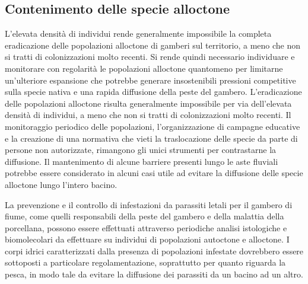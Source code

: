 \documentclass[10pt,twoside,openany,x11names,svgnames,italian,a5paper,dvipsnames,table]{memoir}
\begin{document}
\subsection{Contenimento delle specie alloctone}
L'elevata densità di individui rende generalmente impossibile la completa eradicazione delle popolazioni alloctone di gamberi sul territorio, a meno che non si tratti di colonizzazioni molto recenti. Si rende quindi necessario individuare e monitorare con regolarità le popolazioni alloctone quantomeno per limitarne un'ulteriore espansione che potrebbe generare insostenibili pressioni competitive sulla specie nativa e una rapida diffusione della peste del gambero.  L’eradicazione delle popolazioni alloctone risulta generalmente impossibile per via dell’elevata densità di individui, a meno che non si tratti di colonizzazioni molto recenti. Il monitoraggio periodico delle popolazioni, l’organizzazione di campagne educative e la creazione di una normativa che vieti la traslocazione delle specie da parte di persone non autorizzate, rimangono gli unici strumenti per contrastarne la diffusione. Il mantenimento di alcune barriere presenti lungo le aste fluviali potrebbe essere considerato in alcuni casi utile ad evitare la diffusione delle specie alloctone lungo l’intero bacino.

La prevenzione e il controllo di infestazioni da parassiti letali per il gambero di fiume, come quelli responsabili della peste del gambero e della malattia della porcellana, possono essere effettuati attraverso periodiche analisi istologiche e biomolecolari da effettuare su individui di popolazioni autoctone e alloctone. I corpi idrici caratterizzati dalla presenza di popolazioni infestate dovrebbero essere sottoposti a particolare regolamentazione, soprattutto per quanto riguarda la pesca, in modo tale da evitare la diffusione dei parassiti da un bacino ad un altro. 
\end{document}
